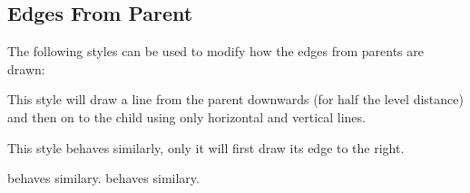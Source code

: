 \subsection{Edges From Parent}

The following styles can be used to modify how the edges from parents
are drawn:

\begin{itemize}
  This style will draw a line from the parent downwards (for half the
  level distance) and then on to the child using only horizontal and
  vertical lines. 
\begin{codeexample}[]
\end{codeexample}
  This style behaves similarly, only it will first draw its edge to
  the right.
\begin{codeexample}[]
\end{codeexample}
  behaves similary. 
  behaves similary. 
\end{itemize}




